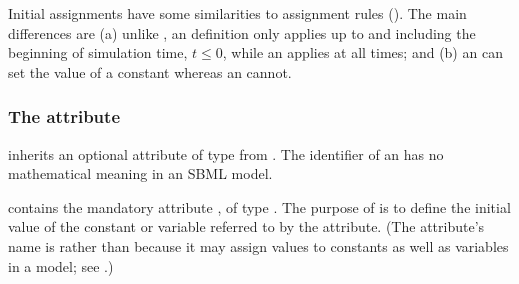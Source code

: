 Initial assignments have some similarities to assignment rules
().  The main differences are (a)
unlike \AssignmentRule, an \InitialAssignment definition only
applies up to and including the beginning of simulation time, \ie
$t \leq 0$, while an \AssignmentRule applies at all times; and (b)
an \InitialAssignment can set the value of a constant whereas an
\AssignmentRule cannot.


\begin{blockChanged}
\subsubsection{The  attribute}
\label{sec:initialassignment-id}

\InitialAssignment inherits an optional  attribute of type  from \SBase.  The identifier of an \InitialAssignment has no mathematical meaning in an SBML \thisLV model.

\end{blockChanged}



\InitialAssignment contains the mandatory attribute , of type .  The purpose of \InitialAssignment is to define the initial value of the constant or variable referred to by the  attribute.  (The attribute's name is  rather than  because it may assign values to constants as well as variables in a model; see .)

